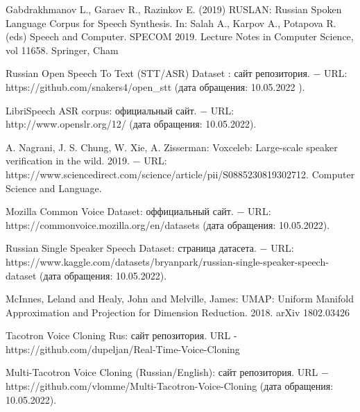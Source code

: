 \documentclass[oneside,final,14pt]{extreport}
\begin{document}
\begin{thebibliography}{0}
 Gabdrakhmanov L., Garaev R., Razinkov E. (2019) RUSLAN: Russian Spoken Language Corpus for Speech Synthesis. In: Salah A., Karpov A., Potapova R. (eds) Speech and Computer. SPECOM 2019. Lecture Notes in Computer Science, vol 11658. Springer, Cham


 Russian Open Speech To Text (STT/ASR) Dataset : сайт репозитория. $-$  URL: https://github.com/snakers4/open_stt (дата обращения: 10.05.2022 ). 

 LibriSpeech ASR corpus: официальный сайт. $-$ URL: http://www.openslr.org/12/ (дата обращения: 10.05.2022).

 A. Nagrani, J. S. Chung, W. Xie, A. Zisserman: Voxceleb: Large-scale speaker verification in the wild. 2019. $-$ URL: https://www.sciencedirect.com/science/article/pii/S0885230819302712. Computer Science and Language.

 Mozilla Common Voice Dataset: оффициальный сайт. $-$ URL: https://commonvoice.mozilla.org/en/datasets (дата обращения: 10.05.2022).

 Russian Single Speaker Speech Dataset: страница датасета. $-$ URL: https://www.kaggle.com/datasets/bryanpark/russian-single-speaker-speech-dataset (дата обращения: 10.05.2022).

 McInnes, Leland and Healy, John and Melville, James: UMAP: Uniform Manifold Approximation and Projection for Dimension Reduction. 2018. arXiv 1802.03426

 Tacotron Voice Cloning Rus: сайт репозитория.  URL - https://github.com/dupeljan/Real-Time-Voice-Cloning

 Multi-Tacotron Voice Cloning (Russian/English): сайт репозитория. URL $-$ https://github.com/vlomme/Multi-Tacotron-Voice-Cloning (дата обращения: 10.05.2022).

\end{thebibliography}
\end{document}
